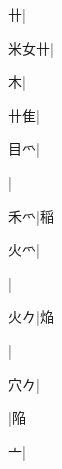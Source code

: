 \begin{multicols}{2}
{{\cjk{}{\cnsym{}　}{\cnsym{}　}卄}\mktsJzrVerticalBar{}{\cjk{}{\cnsym{}　}{\cnsym{}　}{\cnsym{}　}}|{}\par
{\cjk{}米女卄}|{}\par
{\cjk{}{\cnsym{}　}{\cnsym{}　}木}\mktsJzrVerticalBar{}{\cjk{}{\cnsym{}　}{\cnsym{}　}{\cnsym{}　}}|{}\par
{\cjk{}{\cnsym{}　}卄隹}\mktsJzrVerticalBar{}{\cjk{}{\cnsym{}　}{\cnsym{}　}{\cnsym{}　}}|{}\par
{\cjk{}{\cnsym{}　}目{爫}}\mktsJzrVerticalBar{}{\cjk{}{\cnsym{}　}{\cnsym{}　}{\cnsym{}　}}|{}\par
{}\mktsJzrVerticalBar{}{\cjk{}{\cnsym{}　}{\cnsym{}　}{\cnsym{}　}}|{}\par
{\cjk{}{\cnsym{}　}禾{爫}}\mktsJzrVerticalBar{}{\cjk{}{\cnsym{}　}{\cnsym{}　}{\cnsym{}　}}|{\cjk{}稲}\par
{\cjk{}{\cnsym{}　}火{爫}}\mktsJzrVerticalBar{}{\cjk{}{\cnsym{}　}{\cnsym{}　}{\cnsym{}　}}|{}\par
{}\mktsJzrVerticalBar{}{\cjk{}{\cnsym{}　}{\cnsym{}　}{\cnsym{}　}}|{}\par
{\cjk{}{\cnsym{}　}火{\cnxb{}𠂊}}\mktsJzrVerticalBar{}{\cjk{}{\cnsym{}　}{\cnsym{}　}{\cnsym{}　}}|{\cjk{}焔}\par
{}\mktsJzrVerticalBar{}{\cjk{}{\cnsym{}　}{\cnsym{}　}{\cnsym{}　}}|{}\par
{\cjk{}{\cnsym{}　}穴{\cnxb{}𠂊}}\mktsJzrVerticalBar{}{\cjk{}{\cnsym{}　}{\cnsym{}　}{\cnsym{}　}}|{}\par
{}\mktsJzrVerticalBar{}{\cjk{}{\cnsym{}　}{\cnsym{}　}{\cnsym{}　}}|{\cjk{}陥}\par
{\cjk{}{\cnsym{}　}{\cnsym{}　}亠}\mktsJzrVerticalBar{}{\cjk{}{\cnsym{}　}{\cnsym{}　}{\cnsym{}　}}|{}\par
}
\end{multicols}
